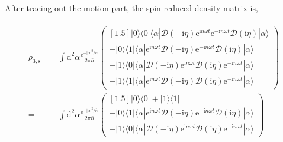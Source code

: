 \documentclass[10pt,fleqn]{article}
\newcommand{\ud}{\mathrm{d}}
\newcommand{\ue}{\mathrm{e}}
\newcommand{\ui}{\mathrm{i}}
\newcommand{\eqar}[1]
{
  \begin{align}
    #1
  \end{align}
}
\newcommand{\abs}[1]{{\left|{#1}\right|}}
\begin{document}
After tracing out the motion part, the spin reduced density matrix is,
\eqar{
  \begin{split}
    \rho_{3,\mathrm{s}}=
    &\int\ud^2\alpha \frac{\ue^{-\abs{\alpha}^2/{\bar n}}}{2\pi {\bar n}}
      \begin{pmatrix}[1.5]
        |0\rangle\langle0|
        \langle\alpha|\mathcal{D}(-\ui\eta)\ue^{\ui n\omega t}
        \ue^{-\ui n\omega t}\mathcal{D}(\ui\eta)|\alpha\rangle\\
        +|0\rangle\langle1|
        \langle\alpha|\ue^{\ui n\omega t}\mathcal{D}(-\ui\eta)
        \ue^{-\ui n\omega t}\mathcal{D}(\ui\eta)|\alpha\rangle
        \\
        +|1\rangle\langle0|
        \langle\alpha|\mathcal{D}(-\ui\eta)\ue^{\ui n\omega t}
        \mathcal{D}(\ui\eta)\ue^{-\ui n\omega t}|\alpha\rangle
        \\
        +|1\rangle\langle1|
        \langle\alpha|\ue^{\ui n\omega t}\mathcal{D}(-\ui\eta)
        \mathcal{D}(\ui\eta)\ue^{-\ui n\omega t}|\alpha\rangle
      \end{pmatrix}\\
    =&\int\ud^2\alpha \frac{\ue^{-\abs{\alpha}^2/{\bar n}}}{2\pi {\bar n}}
       \begin{pmatrix}[1.5]
         |0\rangle\langle0|
         +|1\rangle\langle1|\\
         +|0\rangle\langle1|
         \langle\alpha|\ue^{\ui n\omega t}\mathcal{D}(-\ui\eta)
         \ue^{-\ui n\omega t}\mathcal{D}(\ui\eta)|\alpha\rangle
         \\
         +|1\rangle\langle0|
         \langle\alpha|\mathcal{D}(-\ui\eta)\ue^{\ui n\omega t}
         \mathcal{D}(\ui\eta)\ue^{-\ui n\omega t}|\alpha\rangle
       \end{pmatrix}
  \end{split}
}
\end{document}
